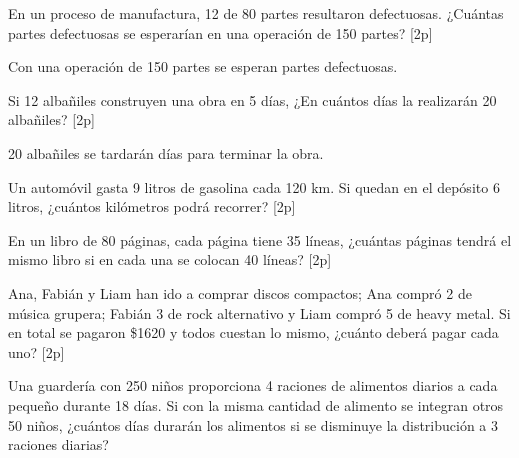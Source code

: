 \documentclass[sin curso]{plantilla-evaluacion-v1}
\begin{document}
\begin{partes}
  \parte En un proceso de manufactura, 12 de 80 partes resultaron defectuosas. 
  ¿Cuántas partes defectuosas se esperarían en una operación de 150 partes? [2p]
  \begin{malla}[height=3cm]
  \end{malla}
  \begin{respuesta}[height=1.5cm]
    \vspace*{7pt} Con una operación de 150 partes se esperan \hspace*{1.5cm} partes defectuosas.
  \end{respuesta}
  \parte Si 12 albañiles construyen una obra en 5 días, ¿En cuántos días la 
  realizarán 20 albañiles? [2p]
  \begin{malla}[height=3cm]
  \end{malla}
  \begin{respuesta}[height=1.5cm]
    \vspace*{7pt} 20 albañiles se tardarán \hspace*{1.5cm} días para terminar la obra.
  \end{respuesta}
  \parte Un automóvil gasta 9 litros de gasolina cada 120 km. Si quedan en el 
  depósito 6 litros, ¿cuántos kilómetros podrá recorrer? [2p]
  \begin{malla}[height=3cm]
  \end{malla}
  \begin{respuesta}[height=1.5cm]
  \end{respuesta}
  \parte En un libro de 80 páginas, cada página tiene 35 líneas, ¿cuántas páginas
  tendrá el mismo libro si en cada una se colocan 40 líneas? [2p]
  \begin{malla}[height=3cm]
  \end{malla}
  \begin{respuesta}[height=1.5cm]
  \end{respuesta}
  \parte Ana, Fabián y Liam han ido a comprar discos compactos; Ana compró 2 de
  música grupera; Fabián 3 de rock alternativo y Liam compró 5 de heavy metal. 
  Si en total se pagaron \$1620 y todos cuestan lo mismo, ¿cuánto deberá 
  pagar cada uno? [2p]
  \begin{malla}[height=4cm]
  \end{malla}
  \begin{respuesta}[height=1.5cm]
  \end{respuesta}
   Una guardería con 250 niños proporciona 4 
  raciones de alimentos diarios a cada pequeño durante 18 días. Si con la misma 
  cantidad de alimento se integran otros 50 niños, ¿cuántos días durarán los alimentos 
  si se disminuye la distribución a 3 raciones diarias? 
  \begin{malla}[height=5cm]
  \end{malla}
  \begin{respuesta}[height=1.5cm]
  \end{respuesta}
\end{partes}
\end{document}
